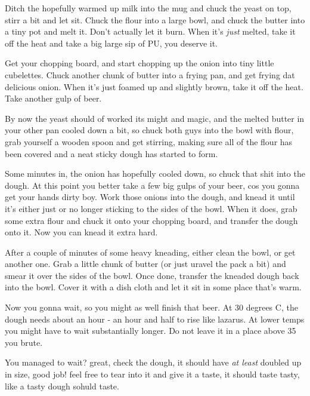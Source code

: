 \documentclass[10pt]{article}
\begin{document}
Ditch the hopefully warmed up milk into the mug and chuck the yeast on top, stirr a bit and let sit. Chuck the flour into a large bowl, and chuck the butter into a tiny pot and melt it. Don't actually let it burn. When it's \textit{just} melted, take it off the heat and take a big large sip of PU, you deserve it.\par

Get your chopping board, and start chopping up the onion into tiny little cubelettes. Chuck another chunk of butter into a frying pan, and get frying dat delicious onion. When it's just foamed up and slightly brown, take it off the heat. Take another gulp of beer.\par

By now the yeast should of worked its might and magic, and the melted butter in your other pan cooled down a bit, so chuck both guys into the bowl with flour, grab yourself a wooden spoon and get stirring, making sure all of the flour has been covered and a neat sticky dough has started to form.\par

Some minutes in, the onion has hopefully cooled down, so chuck that shit into the dough. At this point you better take a few big gulps of your beer, cos you gonna get your hands dirty boy. Work those onions into the dough, and knead it until it's either just or no longer sticking to the sides of the bowl. When it does, grab some extra flour and chuck it onto your chopping board, and transfer the dough onto it. Now you can knead it extra hard.\par

After a couple of minutes of some heavy kneading, either clean the bowl, or get another one. Grab a little chunk of butter (or just uravel the pack a bit) and smear it over the sides of the bowl. Once done, transfer the kneaded dough back into the bowl. Cover it with a dish cloth and let it sit in some place that's warm.\par

Now you gonna wait, so you might as well finish that beer. At 30 degrees C, the dough needs about an hour - an hour and half to rise like lazarus. At lower temps you might have to wait substantially longer. Do not leave it in a place above 35 you brute.\par

You managed to wait? great, check the dough, it should have \textit{at least} doubled up in size, good job! feel free to tear into it and give it a taste, it should taste tasty, like a tasty dough sohuld taste.\par
\end{document}

